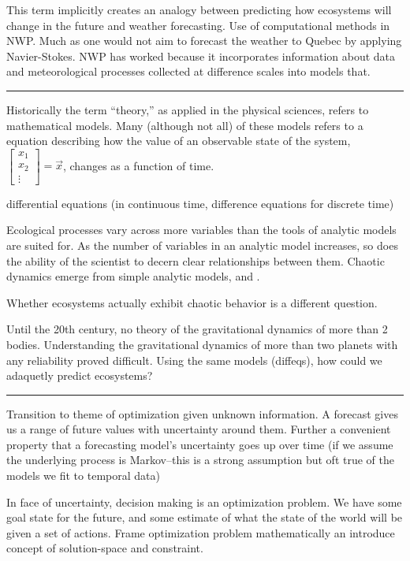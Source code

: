 \documentclass[11pt]{article}
\begin{document}
This term implicitly creates an analogy between predicting how
ecosystems will change in the future and weather forecasting. Use of
computational methods in NWP. Much as one would not aim to forecast the
weather to Quebec by applying Navier-Stokes. NWP has worked because it
incorporates information about data and meteorological processes
collected at difference scales into models that.

\begin{center}\rule{0.5\linewidth}{0.5pt}\end{center}

Historically the term ``theory,'' as applied in the physical sciences,
refers to mathematical models. Many (although not all) of these models
refers to a equation describing how the value of an observable state of
the system,
\(\begin{bmatrix}x_1 \\ x_2 \\ \vdots \end{bmatrix} = \vec{x}\), changes
as a function of time.

differential equations (in continuous time, difference equations for
discrete time)

Ecological processes vary across more variables than the tools of
analytic models are suited for. As the number of variables in an
analytic model increases, so does the ability of the scientist to decern
clear relationships between them. Chaotic dynamics emerge from simple
analytic models, and .

Whether ecosystems actually exhibit chaotic behavior is a different
question.

Until the 20th century, no theory of the gravitational dynamics of more
than 2 bodies. Understanding the gravitational dynamics of more than two
planets with any reliability proved difficult. Using the same models
(diffeqs), how could we adaquetly predict ecosystems?

\begin{center}\rule{0.5\linewidth}{0.5pt}\end{center}

Transition to theme of optimization given unknown information. A
forecast gives us a range of future values with uncertainty around them.
Further a convenient property that a forecasting model's uncertainty
goes up over time (if we assume the underlying process is Markov--this
is a strong assumption but oft true of the models we fit to temporal
data)

In face of uncertainty, decision making is an optimization problem. We
have some goal state for the future, and some estimate of what the state
of the world will be given a set of actions. Frame optimization problem
mathematically an introduce concept of solution-space and constraint.
\end{document}
